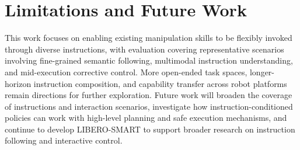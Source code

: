 \clearpage
\hypertarget{limitations-and-future-work}{%
\section{Limitations and Future Work}\label{limitations-and-future-work}}

This work focuses on enabling existing manipulation skills to be
flexibly invoked through diverse instructions, with evaluation covering
representative scenarios involving fine-grained semantic following,
multimodal instruction understanding, and mid-execution corrective control. More open-ended task
spaces, longer-horizon instruction composition, and capability transfer
across robot platforms remain directions for further exploration.
Future work will broaden the coverage of instructions and interaction
scenarios, investigate how instruction-conditioned policies can work
with high-level planning and safe execution mechanisms, and continue to
develop LIBERO-SMART to support broader research on instruction
following and interactive control.

